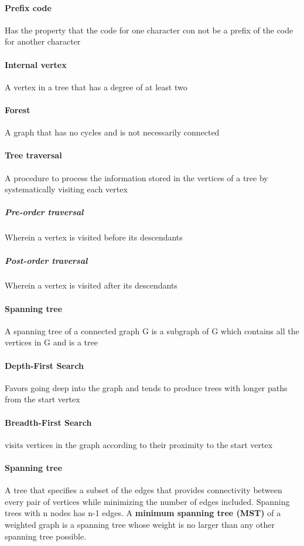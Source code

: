 \documentclass[a4paper]{article}
\begin{document}
  \paragraph{Prefix code} Has the property that the code for one character con not be a prefix of the code for another character
  \paragraph{Internal vertex} A vertex in a tree that has a degree of at least two
  \paragraph{Forest} A graph that has no cycles and is not necessarily connected
  \paragraph{Tree traversal} A procedure to process the information stored in the vertices of a tree by systematically visiting each vertex
  \subparagraph{Pre-order traversal} Wherein a vertex is visited before its descendants
  \subparagraph{Post-order traversal} Wherein a vertex is visited after its descendants
  \paragraph{Spanning tree} A spanning tree of a connected graph G is a subgraph of G which contains all the vertices in G and is a tree
  \paragraph{Depth-First Search} Favors going deep into the graph and tends to produce trees with longer paths from the start vertex
  \paragraph{Breadth-First Search} visits vertices in the graph according to their proximity to the start vertex
  \paragraph{Spanning tree} A tree that specifies a subset of the edges that provides connectivity between every pair of vertices while minimizing the number of edges included. Spanning trees with n nodes has n-1 edges. A \textbf{minimum spanning tree (MST)} of a weighted graph is a spanning tree whose weight is no larger than any other spanning tree possible.
  \pagebreak
\end{document}
